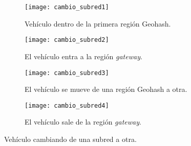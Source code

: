 \begin{figure}[th]
\centering

\begin{subfigure}{\textwidth}
\centering
\texttt{[image: cambio\_subred1]} 
\caption[Vehículo dentro de la primera región Geohash.]{Vehículo dentro de la
primera región Geohash.}
\label{fig:cambio_subred1}
\end{subfigure}

\vspace{0.5cm}

\begin{subfigure}{\textwidth}
\centering
\texttt{[image: cambio\_subred2]} 
\caption[El vehículo entra a la región \textit{gateway}.]{El vehículo entra a la
región \textit{gateway}.}
\label{fig:cambio_subred2}
\end{subfigure}

\vspace{0.5cm}

\begin{subfigure}{\textwidth}
\centering
\texttt{[image: cambio\_subred3]} 
\caption[El vehículo se mueve de una región Geohash a otra.]{El vehículo se
mueve de una región Geohash a otra.}
\label{fig:cambio_subred3}
\end{subfigure}

\vspace{0.5cm}

\begin{subfigure}{\textwidth}
\centering
\texttt{[image: cambio\_subred4]} 
\caption[El vehículo sale de la región \textit{gateway}.]{El vehículo sale de
la región \textit{gateway}.}
\label{fig:cambio_subred4}
\end{subfigure}

\vspace{0.5cm}

\decoRule
\caption[Vehículo cambiando de una subred a otra]{Vehículo cambiando de una
subred a otra.}
\label{fig:cambio_subred}

\end{figure}

